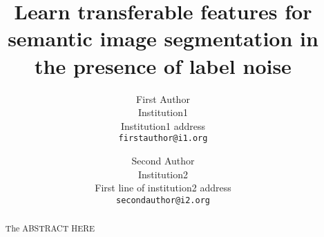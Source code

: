 \documentclass[10pt,twocolumn,letterpaper]{article}
\begin{document}
\title{Learn transferable features for semantic image segmentation in the presence of label noise}

\author{First Author\\
Institution1\\
Institution1 address\\
{\tt\small firstauthor@i1.org}
\and
Second Author\\
Institution2\\
First line of institution2 address\\
{\tt\small secondauthor@i2.org}
}

\maketitle


\begin{abstract}
   The ABSTRACT HERE
\end{abstract}


















{\small


}


\end{document}
